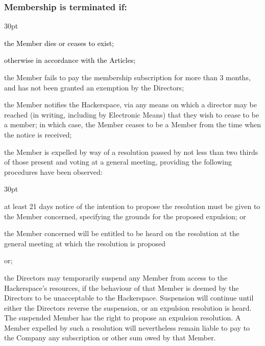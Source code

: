 \documentclass[12pt]{article}
\def\clauseindent{30pt}
\def\fakecolour{black}
\newenvironment{subindentpara}{\raggedright\begin{adjustwidth}{\clauseindent}{}\begin{hanginglist}}{\end{hanginglist}\end{adjustwidth}}
\begin{document}
\subsubsection[Specifics of termination of membership]{Membership is terminated if:}
\begin{subindentpara}
    \item \textcolor{\fakecolour}{the Member dies or ceases to exist;}
    \item \textcolor{\fakecolour}{otherwise in accordance with the Articles;}
    \item the Member fails to pay the membership subscription for more than 3 months, and has not been granted an exemption by the Directors;
    \item the Member notifies the Hackerspace, via any means on which a director may be reached (in writing, including by Electronic Means) that they wish to cease to be a member; in which case, the Member ceases to be a Member from the time when the notice is received;
    \item the Member is expelled by way of a resolution passed by not less than two thirds of those present and voting at a general meeting, providing the following procedures have been observed: 
    \begin{subindentpara} %
        \item at least 21 days notice of the intention to propose the resolution must be given to the Member concerned,  specifying the grounds for the proposed expulsion; or
        \item the Member concerned will be entitled to be heard on the resolution at the general meeting at which the resolution is proposed
    \end{subindentpara}
    \item or;
    \item the Directors may temporarily suspend any Member from access to the Hackerspace's resources, if the behaviour of that Member is deemed by the Directors to be unacceptable to the Hackerspace. Suspension will continue until either the Directors reverse the suspension, or an expulsion resolution is heard. The suspended Member has the right to propose an expulsion resolution. A Member expelled by such a resolution will nevertheless remain liable to pay to the Company any subscription or other sum owed by that Member.
\end{subindentpara}
\end{document}
